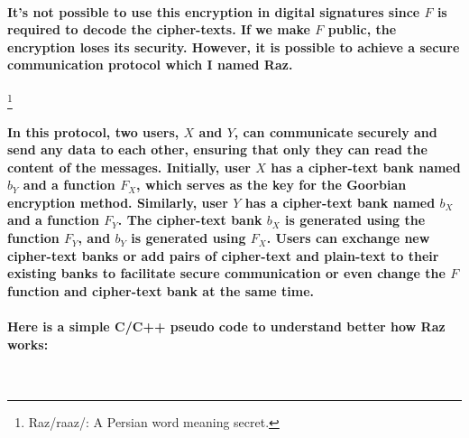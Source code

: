\documentclass[oneside]{book}
\newcommand{\myparagraph}[1]{\paragraph{\textnormal{#1}}}
\begin{document}
\myparagraph{
It's not possible to use this encryption in digital signatures since $F$ is required to decode the cipher-texts. If we make $F$ public, the encryption loses its security. However, it is possible to achieve a secure communication protocol which I named \textbf{Raz}.
}
\footnote{Raz/raaz/: A Persian word meaning secret.}

\myparagraph{
In this protocol, two users, $X$ and $Y$, can communicate securely and send any data to each other, ensuring that only they can read the content of the messages. Initially, user $X$ has a cipher-text bank named $b_Y$ and a function $F_X$, which serves as the key for the Goorbian encryption method. Similarly, user $Y$ has a cipher-text bank named $b_X$ and a function $F_Y$. The cipher-text bank $b_X$ is generated using the function $F_Y$, and $b_Y$ is generated using $F_X$. Users can exchange new cipher-text banks or add pairs of cipher-text and plain-text to their existing banks to facilitate secure communication or even change the $F$ function and cipher-text bank at the same time.
}

\myparagraph{
Here is a simple C/C++ pseudo code to understand better how Raz works:
}

\,
\end{document}
